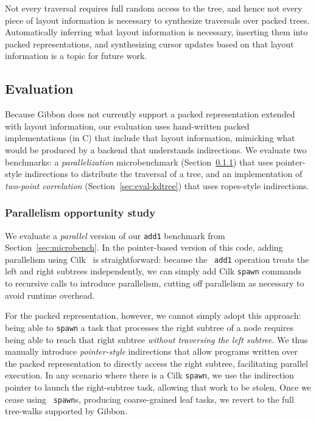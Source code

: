 \documentclass[a4paper,english]{lipics-v2016}
\newcommand{\treelang}{Gibbon\xspace} %
\begin{document}
Not every traversal requires full random access to the tree, and hence not
every piece of layout information is necessary to synthesize traversals over
packed trees.
Automatically inferring what layout information is necessary,
inserting them into packed representations, and synthesizing cursor updates based on that layout information is a topic for future work.


\subsection{Evaluation}\label{sec:eval-parallelism}

Because \treelang{} does not currently support a packed representation extended with layout information, our evaluation uses hand-written packed implementations (in C) that include that layout information, mimicking what would be produced by a backend that understands indirections. We evaluate two benchmarks: a {\em parallelization} microbenchmark (Section~\ref{sec:eval-parallelism}) that uses pointer-style indirections to distribute the traversal of a tree, and an implementation of {\em two-point correlation} (Section~\ref{sec:eval-kdtree}) that uses ropes-style indirections.

\subsubsection{Parallelism opportunity study} \label{sec:eval-parallelism}

We evaluate a {\em parallel} version of our {\tt add1} benchmark from
Section~\ref{sec:microbench}. In the pointer-based version of this code,
adding parallelism using Cilk~\cite{cilk} is straightforward: because the {\tt
add1} operation treats the left and right subtrees independently, we can
simply add Cilk {\tt spawn} commands to recursive calls to introduce
parallelism, cutting off parallelism as necessary to avoid runtime overhead.

For the packed representation, however, we cannot simply adopt this approach:
being able to {\tt spawn} a task that processes the right subtree of a node
requires being able to reach that right subtree {\em without traversing the
left subtree}. We thus manually introduce {\em pointer-style} indirections
that allow programs written over the packed representation to directly access
the right subtree, facilitating parallel execution. In any scenario where
there is a Cilk {\tt spawn}, we use the indirection pointer to launch the
right-subtree task, allowing that work to be stolen. Once we cease using {\tt
spawn}s, producing coarse-grained leaf tasks, we revert to the full tree-walks
supported by \treelang{}.
\end{document}
